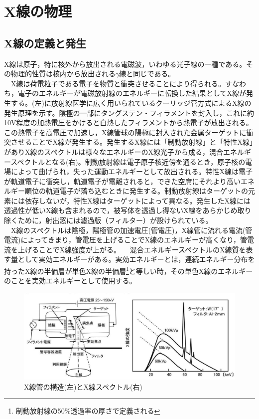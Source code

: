 
\chapter{X線の物理}
\section{X線の定義と発生}
X線は原子，特に核外から放出される電磁波，いわゆる光子線の一種である。その物理的性質は核内から放出される$\gamma$線と同じである。\\
\ \ X線は荷電粒子である電子を物質と衝突させることにより得られる。すなわち，電子のエネルギーが電磁放射線のエネルギーに転換した結果としてX線が発生する。(左)に放射線医学に広く用いられているクーリッジ管方式によるX線の発生原理を示す。陰極の一部にタングステン・フィラメントを封入し，これに約10V程度の加熱電圧をかけると白熱したフィラメントから熱電子が放出される。この熱電子を高電圧で加速し，X線管球の陽極に封入された金属ターゲットに衝突させることでX線が発生する。発生するX線には「制動放射線」と「特性X線」がありX線のスペクトルは様々なエネルギーのX線光子から成る，混合エネルギースペクトルとなる(右)。制動放射線は電子原子核近傍を通るとき，原子核の電場によって曲げられ，失った運動エネルギーとして放出される。特性X線は電子が軌道電子に衝突し，軌道電子が電離されると，できた空席にそれより高いエネルギー順位の軌道電子が落ち込むときに発生する。制動放射線はターゲットの元素には依存しないが，特性X線はターゲットによって異なる。発生したX線には透過性が低いX線も含まれるので，被写体を透過し得ないX線をあらかじめ取り除くために，射出窓には濾過版（フィルター）が設けられている。\\
\ \ X線のスペクトルは陰極，陽極管の加速電圧(管電圧)，X線管に流れる電流(管電流)によってきまり，管電圧を上げることでX線のエネルギーが高くなり，管電流を上げることでX線強度が上がる。
\  \ 混合エネルギースペクトルのX線質を表す量として実効エネルギーがある。実効エネルギーとは，連続エネルギー分布を持ったX線の半価層が単色X線の半価層\footnote{制動放射線の50$\%$透過率の厚さで定義される}と等しい時，その単色X線のエネルギーのことを実効エネルギーとして使用する。

\begin{figure}[H]
 \begin{center}
 \includegraphics[width=14cm]{image/other/X-ray.eps}
 \end{center}
 \caption{X線管の構造(左)とX線スペクトル(右)\cite{iinuma}}
 \label{fig:Xray}
\end{figure}

